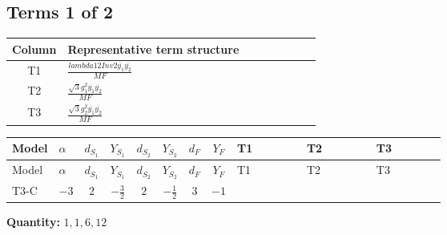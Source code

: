 \documentclass[8pt]{article}
\begin{document}
\begin{landscape}
\subsection*{Terms 1 of 2}
\begin{center}
\begin{tabular}{@{}c >{\raggedright\arraybackslash}p{0.82\linewidth}@{}}
\toprule
Column & Representative term structure \\
\midrule
T1 & \(\displaystyle \frac{lambda12Inv2 \overline{y_{1}} \overline{y_{2}}}{MF}\) \\
\midrule
T2 & \(\displaystyle \frac{\sqrt{3} g_{1}^{2} \overline{y_{1}} \overline{y_{2}}}{MF}\) \\
\midrule
T3 & \(\displaystyle \frac{\sqrt{3} g_{2}^{2} \overline{y_{1}} \overline{y_{2}}}{MF}\) \\
\midrule
\bottomrule
\end{tabular}
\end{center}
\smallskip
\tiny
\begin{longtable}{@{}llcccccc >{\raggedright\arraybackslash}p{0.21\linewidth} >{\raggedright\arraybackslash}p{0.21\linewidth} >{\raggedright\arraybackslash}p{0.21\linewidth}@{}}
\toprule
Model & $\alpha$ & $d_{S_1}$ & $Y_{S_1}$ & $d_{S_2}$ & $Y_{S_2}$ & $d_F$ & $Y_F$ & T1 & T2 & T3 \\
\midrule
\endfirsthead
\toprule
Model & $\alpha$ & $d_{S_1}$ & $Y_{S_1}$ & $d_{S_2}$ & $Y_{S_2}$ & $d_F$ & $Y_F$ & T1 & T2 & T3 \\
\midrule
\endhead
T3-C & $-3$ & $2$ & $-\frac{3}{2}$ & $2$ & $-\frac{1}{2}$ & $3$ & $-1$ & \scriptsize\adjustbox{max width=\linewidth}{$\begin{gathered} \frac{lambda12Inv2 \overline{y_{1}} \overline{y_{2}}}{3 MF}\end{gathered}$} & \scriptsize\adjustbox{max width=\linewidth}{$\begin{gathered} \frac{\sqrt{3} g_{1}^{2} \overline{y_{1}} \overline{y_{2}}}{2 MF}\end{gathered}$} & \scriptsize\adjustbox{max width=\linewidth}{$\begin{gathered} \frac{\sqrt{3} g_{2}^{2} \overline{y_{1}} \overline{y_{2}}}{4 MF}\end{gathered}$} \\
\midrule
\bottomrule
\end{longtable}
\clearpage
\noindent\textbf{Quantity: }$\mathrm{1,1,6,12}$\par\smallskip

\end{landscape}
\end{document}
